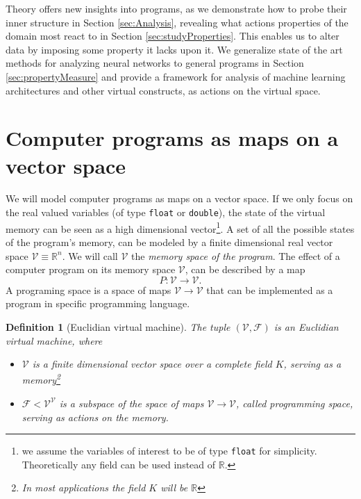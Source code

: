 \documentclass[smallcondensed]{svjour3}
\newcommand{\RR}{\mathbb{R}}
\newcommand{\VV}{\mathcal{V}}
\newcommand{\F}{\mathcal{F}}
\newtheorem{definicija}{Definition}[section]
\begin{document}
Theory offers new insights into programs, as we demonstrate how to probe their inner structure in Section \ref{sec:Analysis}, revealing what actions properties of the domain most react to in Section \ref{sec:studyProperties}. This enables us to alter data by imposing some property it lacks upon it.
We generalize state of the art methods for analyzing neural networks \cite{DeepDream} to general programs in Section \ref{sec:propertyMeasure} and provide a framework for analysis of machine learning architectures and other virtual constructs, as actions on the virtual space. 

\section{Computer programs as maps on a vector space}
We will model computer programs as maps on a vector space. If
we only focus on the real valued variables (of type \texttt{float} or
\texttt{double}),  the state of the virtual memory can be seen as a high
dimensional vector\footnote{we assume the variables of interest to be of type \texttt{float} for
  simplicity. Theoretically any field can be used instead of $\RR$.}. 
A set of all the possible states of the program's memory,
can be modeled by a finite dimensional real vector space $\VV\equiv \RR^n$. We
will call $\VV$ the \emph{memory space of the program}. The effect of a computer
program on its memory space $\VV$, can be described by a map
\begin{equation}
  \label{eq:map}
  P:\VV\to \VV.
\end{equation}
A programing space is a space of maps $\VV\to\VV$ that can be implemented as a
program in specific programming language. 
\begin{definicija}[Euclidian virtual machine] The tuple $(\VV,\F)$ is an Euclidian virtual machine, where
  \begin{itemize}
  \item
  $\VV$ is a finite dimensional vector space over a complete field $K$, serving
  as a memory\footnote{In most applications the field $K$ will
    be $\RR$}
  \item
  $\F< \VV^\VV$ is a subspace of the space of maps $\VV\to \VV$, called \emph{programming space}, serving as actions on the memory.
  \end{itemize}  
\end{definicija}
\end{document}
